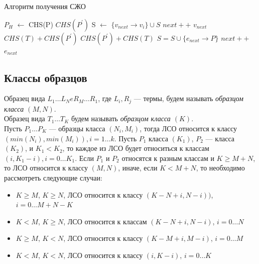 \documentclass[12pt]{article}
\newcommand*\Let[2]{\State #1 $\gets$ #2}
\begin{document}
\begin{algorithm}[H]
\caption{Алгоритм получения СЖО}\label{alg_sjo}
\begin{algorithmic}[1]
\State {}
\State {}
\State {}
\Let{$P_H$}{CHS(P)}
		\State \Return $CHS(P^{'})$
	\EndIf
		\Let{S}{$\{v_{next} \to v_i\} \cup S$}
		\State $next++$
		\State \Return $v_{next}$
	\EndIf
		\State \Return $CHS(T) + CHS(P^{'})$
	\EndIf
		\State \Return $CHS(P^{'}) + CHS(T)$
	\EndIf
	\State $S = S \cup \{e_{next} \to P\}$
	\State $next++$
	\State \Return $e_{next}$
\EndFunction
\end{algorithmic}
\end{algorithm}

\subsection[Классы образцов]{\large Классы образцов}
\hspace{\parindent} Образец вида $L_1 \ldots L_N e R_M \ldots R_1$, где $L_i, R_j$ --- термы, будем называть \textit{образцом класса $(M, N)$}.\\
\indent Образец вида $T_1 \ldots T_K$ будем называть \textit{образцом класса $(K)$}. \\
\indent Пусть $P_1 \ldots P_K$ --- образцы класса $(N_i, M_i)$, тогда ЛСО относится к классу $(min(N_i), min(M_i)), i = 1 \ldots k$. Пусть $P_1$ класса $(K_1)$, $P_2$ --- класса $(K_2)$, и $K_1 < K_2$, то каждое из ЛСО будет относиться к классам $(i, K_1 - i), i = 0 \ldots K_1$. Если $P_1$ и $P_2$ относятся к разным классам и $K \geq M + N$, то ЛСО относится к классу $(M, N)$, иначе, если $K < M + N$, то необходимо рассмотреть следующие случаи:

\begin{itemize}
\item $K \geq M$, $K \geq N$, ЛСО относится к классу $(K - N + i, N - i))$, $i = 0 \ldots M + N - K$
\item $K < M$, $K \geq N$, ЛСО относится к классам $(K - N + i, N - i)$, $i = 0 \ldots N$ 
\item $K \geq M$, $K < N$, ЛСО относится к классу $(K - M + i, M - i)$, $i = 0 \ldots M$
\item $K < M$, $K < N$, ЛСО относится к классу $(i, K - i)$, $i = 0 \ldots K$
\end{itemize}
 
\end{document}
